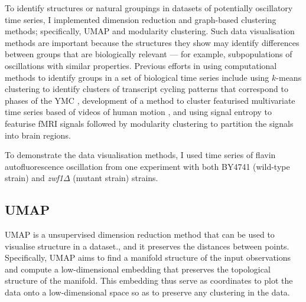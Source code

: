 To identify structures or natural groupings in datasets of potentially oscillatory time series, I implemented dimension reduction and graph-based clustering methods; specifically, UMAP and modularity clustering.
Such data visualisation methods are important because the structures they show may identify differences between groups that are biologically relevant --- for example, subpopulations of oscillations with similar properties.
Previous efforts in using computational methods to identify groups in a set of biological time series include using $k$-means clustering to identify clusters of transcript cycling patterns that correspond to phases of the YMC \parencite{tuLogicYeastMetabolic2005}, development of a method to cluster featurised multivariate time series based of videos of human motion \parencite{wangStructureBasedStatisticalFeatures2007}, and using signal entropy to featurise fMRI signals followed by modularity clustering to partition the signals into brain regions.

To demonstrate the data visualisation methods, I used time series of flavin autofluorescence oscillation from one experiment with both BY4741 (wild-type strain) and \textit{zwf1$\Delta$} (mutant strain) strains.


\subsection{UMAP}
\label{subsec:analysis-clustering-umap}

UMAP \parencite{mcinnesUMAPUniformManifold2020} is a unsupervised dimension reduction method that can be used to visualise structure in a dataset., and it preserves the distances between points.
Specifically, UMAP aims to find a manifold structure of the input observations and compute a low-dimensional embedding that preserves the topological structure of the manifold.
This embedding thus serve as coordinates to plot the data onto a low-dimensional space so as to preserve any clustering in the data.

